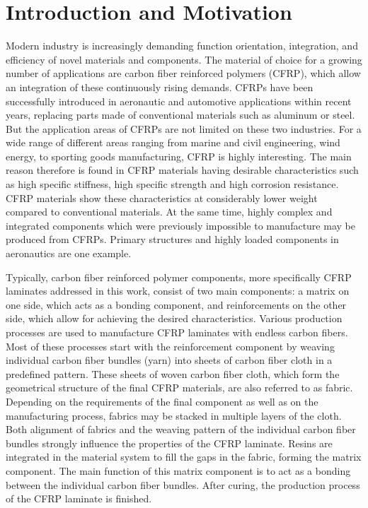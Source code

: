 


\section{Introduction and Motivation}
\label{sec:intro}
Modern industry is increasingly demanding function orientation, integration, and efficiency of novel materials and components. The material of choice for a growing number of applications are carbon fiber reinforced polymers (CFRP), which allow an integration of these continuously rising demands. CFRPs have been successfully introduced in aeronautic and automotive applications within recent years, replacing parts made of conventional materials such as aluminum or steel. But the application areas of CFRPs are not limited on these two industries. For a wide range of different areas ranging from marine and civil engineering, wind energy, to sporting goods manufacturing, CFRP is highly interesting. The main reason therefore is found in CFRP materials having desirable characteristics such as high specific stiffness, high specific strength and high corrosion resistance. CFRP materials show these characteristics at considerably lower weight compared to conventional materials. At the same time, highly complex and integrated components which were previously impossible to manufacture may be produced from CFRPs. Primary structures and highly loaded components in aeronautics are one example.

Typically, carbon fiber reinforced polymer components, more specifically CFRP laminates addressed in this work, consist of two main components:
a matrix on one side, which acts as a bonding component, and  reinforcements on the other side, which allow for achieving the desired characteristics.  Various production processes are used to manufacture CFRP laminates with endless carbon fibers. Most of these processes start with the reinforcement component by weaving individual carbon fiber bundles (yarn) into sheets of carbon fiber cloth in a predefined pattern. These sheets of woven carbon fiber cloth, which form the geometrical structure of the final CFRP materials, are also referred to as fabric. Depending on the requirements of the final component as well as on the manufacturing process, fabrics may be stacked in multiple layers of the cloth. Both alignment of fabrics and the weaving pattern of the individual carbon fiber bundles strongly influence the properties of the CFRP laminate. Resins are integrated in the material system to fill the gaps in the fabric, forming the matrix component. The main function of this matrix component is to act as a bonding between the individual carbon fiber bundles. After curing, the production process of the CFRP laminate is finished. 

